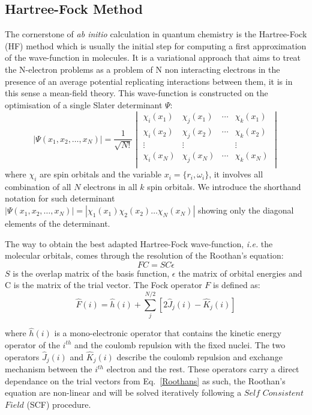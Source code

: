 \documentclass[12pt,a4paper]{report}
\numberwithin{equation}{section}
\begin{document}
\subsection{Hartree-Fock Method}
The cornerstone of \textit{ab initio} calculation in quantum chemistry is the Hartree-Fock (HF) method which is usually the initial step for computing a first approximation of the wave-function in molecules. 
It is a variational approach that aims to treat the N-electron problems as a problem of N non interacting electrons in the presence of an average potential replicating interactions between them, it is in this sense a mean-field theory.
This wave-function is constructed on the optimisation of a single Slater determinant $\Psi$:\cite{slater_theory_1929}
\begin{equation}
    |\Psi(x_1,x_2,\ldots,x_N)|=\frac{1}{\sqrt{N!}}
    \begin{vmatrix}
        \chi_i (x_1) & \chi_j (x_1) & \cdots & \chi_k (x_1)\\
        \chi_i (x_2) & \chi_j (x_2) & \cdots & \chi_k (x_2)\\
        \vdots & \vdots &   &  \vdots\\
        \chi_i (x_N) & \chi_j (x_N) & \cdots & \chi_k (x_N)\\
    \end{vmatrix}
\end{equation}
where $\chi_i$ are spin orbitals and the variable $x_i=\{r_i,\omega_i\}$, it involves all combination of all $N$ electrons in all $k$ spin orbitals. 
We introduce the shorthand notation for such determinant $|\Psi(x_1,x_2,\ldots,x_N)|=|\chi_1(x_1)\chi_2(x_2)\ldots\chi_N(x_N)|$ showing only the diagonal elements of the determinant.

The way to obtain the best adapted Hartree-Fock wave-function, \textit{i.e.} the molecular orbitals, comes through the resolution of the Roothan's equation:\cite{roothaan_new_1951}
\begin{equation}\label{Roothans}
    FC=SC\epsilon
\end{equation}
$S$ is the overlap matrix of the basis function, $\epsilon$ the matrix of orbital energies and C is the matrix of the trial vector.
The Fock operator $F$ is defined as:
\begin{equation}
    \hat{F}(i)=\hat{h}(i)+\sum_{j}^{N/2}[2\hat{J}_{j}(i)-\hat{K}_{j}(i)]
\end{equation}

where $\hat{h}(i)$ is a mono-electronic operator that contains the kinetic energy operator of the $i^{th}$ and the coulomb repulsion with the fixed nuclei.
The two operators $\hat{J}_{j}(i)$ and $\hat{K}_{j}(i)$ describe the coulomb repulsion and exchange mechanism between the $i^{th}$ electron and the rest.
These operators carry a direct dependance on the trial vectors from Eq.~\ref{Roothans} as such, the Roothan's equation are non-linear and will be solved iteratively following a $Self$ $Consistent$ $Field$ (SCF) procedure.
\end{document}

